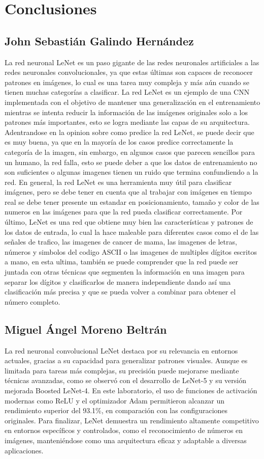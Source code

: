 \section{Conclusiones}

\subsection{John Sebastián Galindo Hernández}
La red neuronal LeNet es un paso gigante de las redes neuronales artificiales 
a las redes neuronales convolucionales, ya que estas últimas son capaces de
reconocer patrones en imágenes, lo cual es una tarea muy compleja y más aún
cuando se tienen muchas categorías a clasificar. La red LeNet es un ejemplo de
una CNN implementada con el objetivo de mantener una generalización en el 
entrenamiento mientras se intenta reducir la información de las imágenes 
originales solo a los patrones más importantes, esto se logra mediante las 
capas de su arquitectura. Adentrandose en la opinion sobre como predice la red
LeNet, se puede decir que es muy buena, ya que en la mayoría de los casos
predice correctamente la categoría de la imagen, sin embargo, en algunos casos
que parecen sencillos para un humano, la red falla, esto se puede deber a que 
los datos de entrenamiento no son suficientes o algunas imagenes tienen un 
ruido que termina confundiendo a la red. En general, la red LeNet es una
herramienta muy útil para clasificar imágenes, pero se debe tener en cuenta que
al trabajar con imágenes en tiempo real se debe tener presente un estandar en
posicionamiento, tamaño y color de las numeros en las imágenes para que la red pueda
clasificar correctamente. Por último, LeNet es una red que obtiene muy bien las 
características y patrones de los datos de entrada, lo cual la hace maleable para
diferentes casos como el de las señales de trafico, las imagenes de cancer de mama,
las imagenes de letras, números y simbolos del codigo ASCII
o las imagenes de multiples dígitos escritos a mano, en esta ultima, también se 
puede comprender que la red puede ser juntada con otras técnicas que segmenten 
la información en una imagen para separar los dígitos y clasificarlos de manera
independiente dando así una clasificación más precisa y que se pueda volver a 
combinar para obtener el número completo.

\subsection{Miguel Ángel Moreno Beltrán}
La red neuronal convolucional LeNet destaca por su relevancia en entornos actuales, 
gracias a su capacidad para generalizar patrones visuales. 
Aunque es limitada para tareas más complejas, su precisión puede mejorarse mediante técnicas avanzadas, 
como se observó con el desarrollo de LeNet-5 y su versión mejorada Boosted LeNet-4. 
En este laboratorio, el uso de funciones de activación modernas como ReLU y 
el optimizador Adam permitieron alcanzar un rendimiento superior del 93.1\%, 
en comparación con las configuraciones originales. 
Para finalizar, LeNet demuestra un rendimiento altamente competitivo en entornos 
específicos y controlados, como el reconocimiento de números en imágenes, 
manteniéndose como una arquitectura eficaz y adaptable a diversas aplicaciones.


